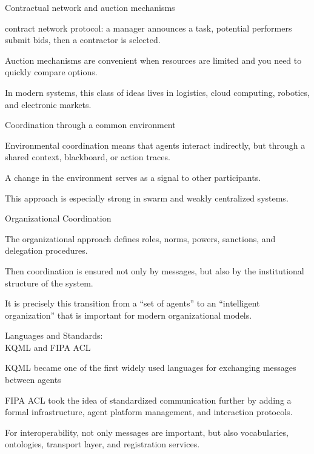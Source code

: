 \begin{frame}{Contractual network and auction mechanisms}
	\topline
	\justifying
	\begin{textitemize}
		\item contract network protocol: a manager announces a task, potential performers submit bids, then a contractor is selected.
		\item Auction mechanisms are convenient when resources are limited and you need to quickly compare options.
		\item In modern systems, this class of ideas lives in logistics, cloud computing, robotics, and electronic markets.
	\end{textitemize}
\end{frame}

\begin{frame}{Coordination through a common environment}
	\topline
	\justifying
	\begin{textitemize}
		\item Environmental coordination means that agents interact indirectly, but through a shared context, blackboard, or action traces.
		\item A change in the environment serves as a signal to other participants.
		\item This approach is especially strong in swarm and weakly centralized systems.
	\end{textitemize}
\end{frame}

\begin{frame}{Organizational Coordination}
	\topline
	\justifying
	\begin{textitemize}
		\item The organizational approach defines roles, norms, powers, sanctions, and delegation procedures.
		\item Then coordination is ensured not only by messages, but also by the institutional structure of the system.
		\item It is precisely this transition from a “set of agents” to an “intelligent organization” that is important for modern organizational models.
	\end{textitemize}
\end{frame}

\begin{frame}{Languages and Standards:\\ KQML and FIPA ACL}
	\topline
	\justifying
	\begin{textitemize}
		\item KQML became one of the first widely used languages for exchanging messages between agents
		\item FIPA ACL took the idea of standardized communication further by adding a formal infrastructure, agent platform management, and interaction protocols.
		\item For interoperability, not only messages are important, but also vocabularies, ontologies, transport layer, and registration services.
	\end{textitemize}
\end{frame}

